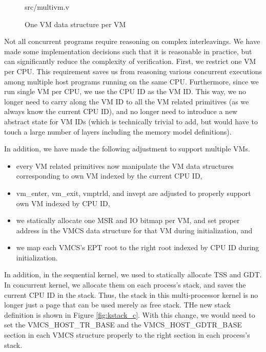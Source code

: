 \begin{figure}
	 {src/multivm.v}
	\caption{One VM data structure per VM}
	\label{fig:multivm_v}
\end{figure}

Not all concurrent programs require reasoning on complex interleavings. We have made
some implementation decisions such that it is reasonable in practice, but can significantly
reduce the complexity of verification. First, we restrict one VM per CPU. This requirement
saves us from reasoning various concurrent executions among multiple host programs running
on the same CPU. Furthermore, since we run single VM per CPU, we use the CPU ID as the VM ID.
This way, we no longer need to carry along the VM ID to all the VM related primitives (as we always
know the current CPU ID), and no longer need to introduce a new abstract state for VM IDs (which
is technically trivial to add, but would have to touch a large number of layers including the memory
model definitions).

In addition, we have made the following adjustment to support multiple VMs.

\begin{itemize}
\item every VM related primitives now manipulate the VM data structures corresponding to own
VM indexed by the current CPU ID,
\item \textsf{vm\_enter}, \textsf{vm\_exit}, \textsf{vmptrld}, and \textsf{invept} are adjusted
to properly support own VM indexed by CPU ID, 
\item we statically allocate one MSR and IO bitmap per VM, and set proper address in the
VMCS data structure for that VM during initialization, and
\item we map each VMCS's EPT root to the right root indexed by CPU ID during initialization.
\end{itemize}

In addition, in the sequential kernel, we used to statically allocate TSS and GDT.
In concurrent kernel, we allocate them on each process's stack, and saves the current CPU ID in the stack.
Thus, the stack in this multi-processor kernel is no longer just a page that can be used merely as free stack.
THe new stack definition is shown in Figure \ref{fig:kstack_c}. 
With this change, we would need to set the \textsf{VMCS\_HOST\_TR\_BASE} and the
\textsf{VMCS\_HOST\_GDTR\_BASE} section in each VMCS structure properly to the right section 
in each process's stack.

